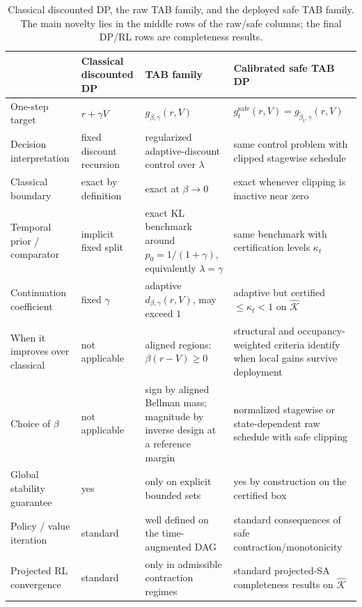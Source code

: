 \documentclass{article}
\theoremstyle{remark}
\newcommand{\safe}{\mathrm{safe}}
\newcommand{\Ksafe}{\widehat{\mathcal K}}
\begin{document}
\begin{table}[t]
\caption{Classical discounted DP, the raw TAB family, and the deployed safe TAB family. The main novelty lies in the middle rows of the raw/safe columns; the final DP/RL rows are completeness results.}
\label{tab:master-comparison}
\small
\centering
\begin{tabularx}{\textwidth}{@{}>{\raggedright\arraybackslash}p{}XXX@{}}
\toprule
 & Classical discounted DP & TAB family & Calibrated safe TAB DP \\
\midrule
One-step target & $r+\gamma V$ & $g_{\beta,\gamma}(r,V)$ & $g_t^{\safe}(r,V)=g_{\widetilde\beta_t,\gamma}(r,V)$ \\
Decision interpretation & fixed discount recursion & regularized adaptive-discount control over $\lambda$ & same control problem with clipped stagewise schedule \\
Classical boundary & exact by definition & exact at $\beta\to 0$ & exact whenever clipping is inactive near zero \\
Temporal prior / comparator & implicit fixed split & exact KL benchmark around $p_0=1/(1+\gamma)$, equivalently $\lambda=\gamma$ & same benchmark with certification levels $\kappa_t$ \\
Continuation coefficient & fixed $\gamma$ & adaptive $d_{\beta,\gamma}(r,V)$, may exceed $1$ & adaptive but certified $\le \kappa_t<1$ on $\Ksafe$ \\
When it improves over classical & not applicable & aligned regions: $\beta(r-V)\ge 0$ & structural and occupancy-weighted criteria identify when local gains survive deployment \\
Choice of $\beta$ & not applicable & sign by aligned Bellman mass; magnitude by inverse design at a reference margin & normalized stagewise or state-dependent raw schedule with safe clipping \\
Global stability guarantee & yes & only on explicit bounded sets & yes by construction on the certified box \\
Policy / value iteration & standard & well defined on the time-augmented DAG & standard consequences of safe contraction/monotonicity \\
Projected RL convergence & standard & only in admissible contraction regimes & standard projected-SA completeness results on $\Ksafe$ \\
\bottomrule
\end{tabularx}
\end{table}
\end{document}
